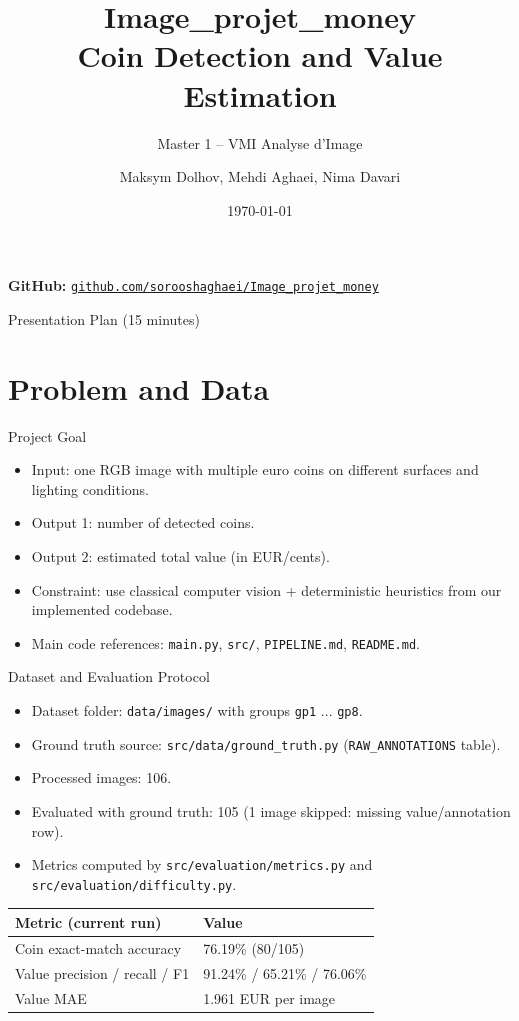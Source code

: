 \documentclass[aspectratio=169]{beamer}
\title[Image\_projet\_money]{Image\_projet\_money \\ Coin Detection and Value Estimation}
\subtitle{Master 1 -- VMI Analyse d'Image}
\author{Maksym Dolhov, Mehdi Aghaei, Nima Davari}
\institute{Universite Paris Cite}
\date{\today}
\begin{document}
\begin{frame}
  \titlepage
  \vspace{-0.4em}
  \centering
  \small \textbf{GitHub: }
  \href{https://github.com/sorooshaghaei/Image_projet_money}{\texttt{github.com/sorooshaghaei/Image\_projet\_money}}
\end{frame}

\begin{frame}{Presentation Plan (15 minutes)}
  \tableofcontents
\end{frame}

\section{Problem and Data}

\begin{frame}{Project Goal}
  \begin{itemize}
    \item Input: one RGB image with multiple euro coins on different surfaces and lighting conditions.
    \item Output 1: number of detected coins.
    \item Output 2: estimated total value (in EUR/cents).
    \item Constraint: use classical computer vision + deterministic heuristics from our implemented codebase.
    \item Main code references: \texttt{main.py}, \texttt{src/}, \texttt{PIPELINE.md}, \texttt{README.md}.
  \end{itemize}
\end{frame}

\begin{frame}{Dataset and Evaluation Protocol}
  \begin{itemize}
    \item Dataset folder: \texttt{data/images/} with groups \texttt{gp1} ... \texttt{gp8}.
    \item Ground truth source: \texttt{src/data/ground\_truth.py} (\texttt{RAW\_ANNOTATIONS} table).
    \item Processed images: 106.
    \item Evaluated with ground truth: 105 (1 image skipped: missing value/annotation row).
    \item Metrics computed by \texttt{src/evaluation/metrics.py} and \texttt{src/evaluation/difficulty.py}.
  \end{itemize}

  \vspace{0.3em}
  \begin{tabular}{@{}ll@{}}
    \toprule
    Metric (current run) & Value \\
    \midrule
    Coin exact-match accuracy & 76.19\% (80/105) \\
    Value precision / recall / F1 & 91.24\% / 65.21\% / 76.06\% \\
    Value MAE & 1.961 EUR per image \\
    \bottomrule
  \end{tabular}
\end{frame}
\end{document}
